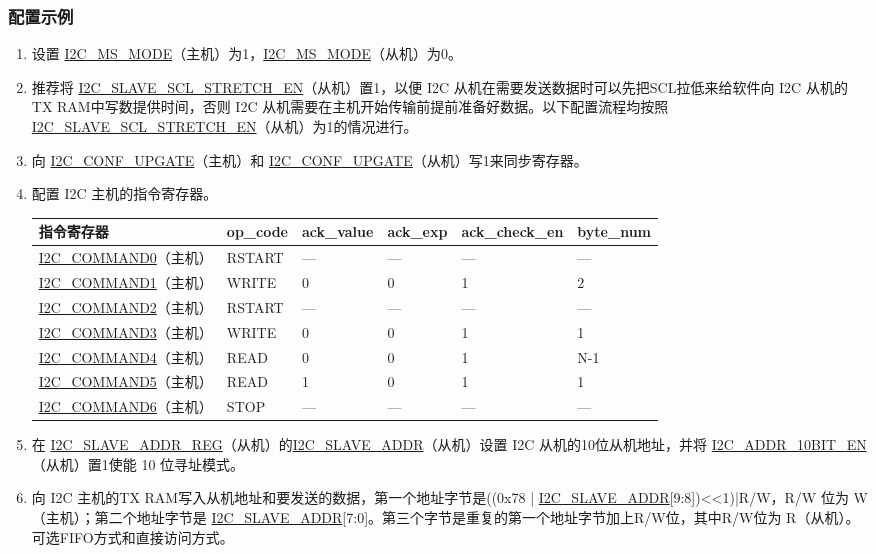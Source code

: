 \documentclass[main\_\_CN.tex]{subfiles}
\begin{document}
\subsubsection{配置示例}
\begin{enumerate}
\item 设置 \hyperref[fielddesc:I2CMSMODE]{I2C\_MS\_MODE}（主机）为1，\hyperref[fielddesc:I2CMSMODE]{I2C\_MS\_MODE}（从机）为0。
\item 推荐将 \hyperref[fielddesc:I2CSLAVESCLSTRETCHEN]{I2C\_SLAVE\_SCL\_STRETCH\_EN}（从机）置1，以便 I2C 从机在需要发送数据时可以先把SCL拉低来给软件向 I2C 从机的TX RAM中写数提供时间，否则 I2C 从机需要在主机开始传输前提前准备好数据。以下配置流程均按照\hyperref[fielddesc:I2CSLAVESCLSTRETCHEN]{I2C\_SLAVE\_SCL\_STRETCH\_EN}（从机）为1的情况进行。 
\item 向 \hyperref[fielddesc:I2CCONFUPGATE]{I2C\_CONF\_UPGATE}（主机）和 \hyperref[fielddesc:I2CCONFUPGATE]{I2C\_CONF\_UPGATE}（从机）写1来同步寄存器。
\item 配置 I2C 主机的指令寄存器。
\vspace{1em}
\begin{longtable}{ | p{4cm} | p{2cm} | p{2cm} | p{2cm} |p{2.2cm} | p{1.8cm} |}
\hline\rowcolor{lightgray}
指令寄存器& op\_code & ack\_value&ack\_exp&ack\_check\_en&byte\_num  \\ \hline
\hyperref[fielddesc:I2CCOMMAND0]{I2C\_COMMAND0}（主机）& RSTART& ---&---&---&---  \\ \hline
\hyperref[fielddesc:I2CCOMMAND1]{I2C\_COMMAND1}（主机）& WRITE& 0&0&1&2  \\ \hline
\hyperref[fielddesc:I2CCOMMAND2]{I2C\_COMMAND2}（主机）& RSTART& ---&---&---&---  \\ \hline
\hyperref[fielddesc:I2CCOMMAND3]{I2C\_COMMAND3}（主机）& WRITE& 0&0&1&1  \\ \hline
\hyperref[fielddesc:I2CCOMMAND4]{I2C\_COMMAND4}（主机）& READ& 0&0&1&N-1  \\ \hline
\hyperref[fielddesc:I2CCOMMAND5]{I2C\_COMMAND5}（主机）& READ& 1&0&1&1  \\ \hline
\hyperref[fielddesc:I2CCOMMAND6]{I2C\_COMMAND6}（主机）& STOP& ---&---&---&---  \\ \hline
\end{longtable}

\item 在 \hyperref[regdesc:I2CSLAVEADDRREG]{I2C\_SLAVE\_ADDR\_REG}（从机）的\hyperref[fielddesc:I2CSLAVEADDR]{I2C\_SLAVE\_ADDR}（从机）设置 I2C 从机的10位从机地址，并将 \hyperref[fielddesc:I2CADDR10BITEN]{I2C\_ADDR\_10BIT\_EN}（从机）置1使能 10 位寻址模式。
\item 向 I2C 主机的TX RAM写入从机地址和要发送的数据，第一个地址字节是((0x78 | \hyperref[fielddesc:I2CSLAVEADDR]{I2C\_SLAVE\_ADDR}[9:8])<<1)|R/W，R/W 位为 W（主机）；第二个地址字节是 \hyperref[fielddesc:I2CSLAVEADDR]{I2C\_SLAVE\_ADDR}[7:0]。第三个字节是重复的第一个地址字节加上R/W位，其中R/W位为 R（从机）。可选FIFO方式和直接访问方式。


\end{enumerate}
\end{document}
